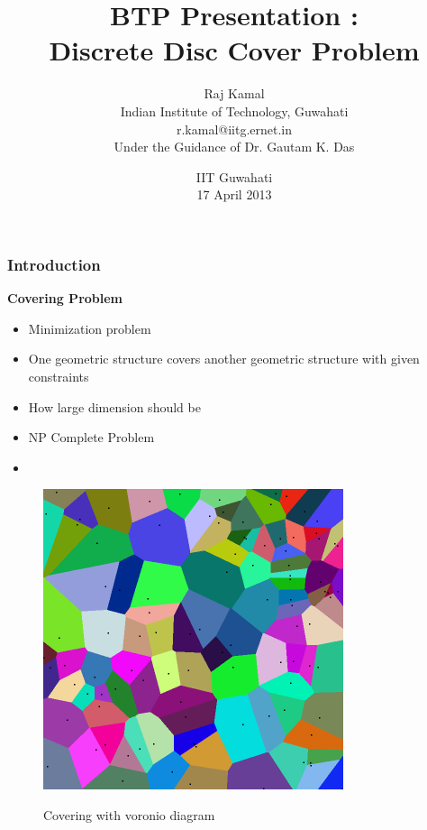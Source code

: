 \documentclass[blue]{beamer}
\begin{document}
\title 
[Discrete Dics Cover Problem
\hspace{0.5cm}
\insertframenumber / \inserttotalframenumber]
{BTP Presentation : \\ Discrete Disc Cover Problem }

\author
 [Raj Kamal]
 {Raj Kamal\\
  Indian Institute of Technology, Guwahati\\
  r.kamal@iitg.ernet.in\\
  Under the Guidance of Dr. Gautam K. Das\\
  \date {IIT Guwahati\\
   17 April 2013}}
   
   \begin{frame}
 \titlepage
\end{frame}

\begin{frame}
\frametitle{Introduction}
{\color{red}\textbf{Covering Problem}}
\begin{itemize}
   
    \item Minimization problem
    \item One geometric structure covers another geometric structure with given constraints
    \item How large dimension should be
    \item NP Complete Problem
    \item {\color{blue}{Approximation and Statistical methods}}
   \end{itemize}
  \begin{figure}[H]
     \caption{Covering with voronio diagram} 
        \centering
           \scalebox{0.25}
          {\includegraphics{cover1.png}}
     \end{figure}
\end{frame}
\end{document}
